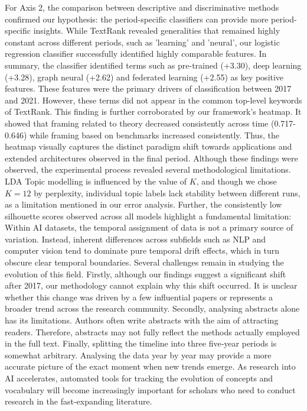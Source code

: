 \documentclass[11pt]{article}
\begin{document}
For Axis 2, the comparison between descriptive and discriminative methods confirmed our hypothesis: the period-specific classifiers can provide more period-specific insights. While TextRank revealed generalities that remained highly constant across different periods, such as 'learning' and 'neural', our logistic regression classifier successfully identified highly comparable features. In summary, the classifier identified terms such as pre-trained (+3.30), deep learning (+3.28), graph neural (+2.62) and federated learning (+2.55) as key positive features. These features were the primary drivers of classification between 2017 and 2021. However, these terms did not appear in the common top-level keywords of TextRank. This finding is further corroborated by our framework’s heatmap. It showed that framing related to theory decreased consistently across time (0.717-0.646) while framing based on benchmarks increased consistently. Thus, the heatmap visually captures the distinct paradigm shift towards applications and extended architectures observed in the final period.
Although these findings were observed, the experimental process revealed several methodological limitations. LDA Topic modelling is influenced by the value of $K$, and though we chose $K=12$ by perplexity, individual topic labels lack stability between different runs, as a limitation mentioned in our error analysis. Further, the consistently low silhouette scores observed across all models highlight a fundamental limitation: Within AI datasets, the temporal assignment of data is not a primary source of variation. Instead, inherent differences across subfields such as NLP and computer vision tend to dominate pure temporal drift effects, which in turn obscure clear temporal boundaries.
Several challenges remain in studying the evolution of this field. Firstly, although our findings suggest a significant shift after 2017, our methodology cannot explain why this shift occurred. It is unclear whether this change was driven by a few influential papers or represents a broader trend across the research community. Secondly, analysing abstracts alone has its limitations. Authors often write abstracts with the aim of attracting readers. Therefore, abstracts may not fully reflect the methods actually employed in the full text. Finally, splitting the timeline into three five‑year periods is somewhat arbitrary. Analysing the data year by year may provide a more accurate picture of the exact moment when new trends emerge. As research into AI accelerates, automated tools for tracking the evolution of concepts and vocabulary will become increasingly important for scholars who need to conduct research in the fast-expanding literature.


\end{document}
